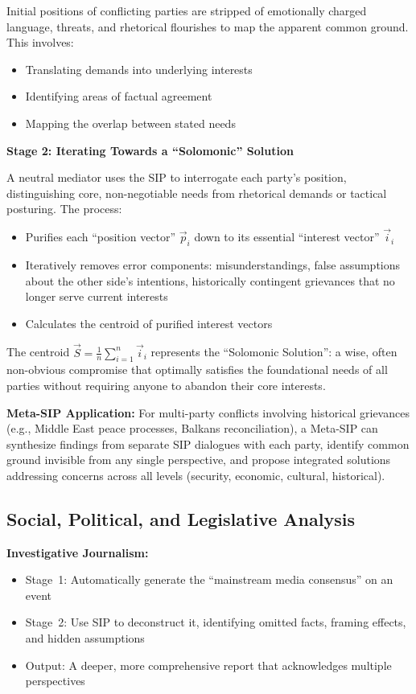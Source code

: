 \documentclass[11pt,a4paper]{article}
\begin{document}
Initial positions of conflicting parties are stripped of emotionally charged language, threats, and rhetorical flourishes to map the apparent common ground. This involves:
\begin{itemize}[nosep]
    \item Translating demands into underlying interests
    \item Identifying areas of factual agreement
    \item Mapping the overlap between stated needs
\end{itemize}

\textbf{Stage 2: Iterating Towards a ``Solomonic'' Solution}

A neutral mediator uses the SIP to interrogate each party's position, distinguishing core, non-negotiable needs from rhetorical demands or tactical posturing. The process:
\begin{itemize}[nosep]
    \item Purifies each ``position vector'' $\vec{p}_i$ down to its essential ``interest vector'' $\vec{i}_i$
    \item Iteratively removes error components: misunderstandings, false assumptions about the other side's intentions, historically contingent grievances that no longer serve current interests
    \item Calculates the centroid of purified interest vectors
\end{itemize}

The centroid $\vec{S} = \frac{1}{n}\sum_{i=1}^n \vec{i}_i$ represents the ``Solomonic Solution'': a wise, often non-obvious compromise that optimally satisfies the foundational needs of all parties without requiring anyone to abandon their core interests.

\textbf{Meta-SIP Application:} For multi-party conflicts involving historical grievances (e.g., Middle East peace processes, Balkans reconciliation), a Meta-SIP can synthesize findings from separate SIP dialogues with each party, identify common ground invisible from any single perspective, and propose integrated solutions addressing concerns across all levels (security, economic, cultural, historical).

\subsection{Social, Political, and Legislative Analysis}

\textbf{Investigative Journalism:}
\begin{itemize}[nosep]
    \item Stage~1: Automatically generate the ``mainstream media consensus'' on an event
    \item Stage~2: Use SIP to deconstruct it, identifying omitted facts, framing effects, and hidden assumptions
    \item Output: A deeper, more comprehensive report that acknowledges multiple perspectives
\end{itemize}
\end{document}
